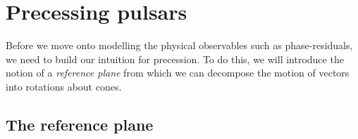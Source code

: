 \documentclass[../full_thesis/full_thesis.tex]{subfiles}
\begin{document}
%




\section{Precessing pulsars}
\label{sec: precessing pulsars}
Before we move onto modelling the physical observables such as phase-residuals,
we need to build our intuition for precession. To do this, we will introduce
the notion of a \emph{reference plane} from which we can decompose the motion of
vectors into rotations about cones.

\subsection{The reference plane}
\label{sec: reference plane}
\end{document}

